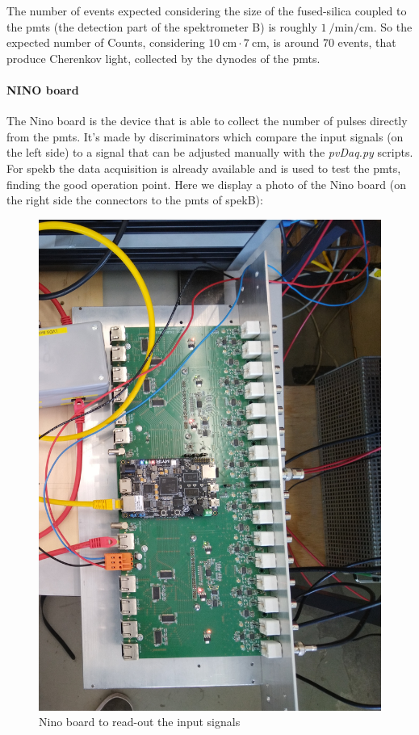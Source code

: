 \documentclass[10pt,a4paper]{article}
\begin{document}
The number of events expected considering the size of the fused-silica coupled to the pmts (the detection part of the spektrometer B) is roughly $\SI{1}{ \per \minute \per \cm}$. So the expected number of Counts, considering $\SI{10}{ \centi \meter } \cdot \SI{7}{ \centi \meter }$, is around 70 events, that produce Cherenkov light, collected by the dynodes of the pmts. 

\paragraph{NINO board}
The Nino board is the device that is able to collect the number of pulses directly from the pmts. It's made by discriminators which compare the input signals (on the left side) to a signal that can be adjusted manually with the \textit{pvDaq.py} scripts. For spekb the data acquisition is already available and is used to test the pmts, finding the good operation point. Here we display a photo of the Nino board (on the right side the connectors to the pmts of spekB):

\begin{figure}[hbtp]
\centering
\includegraphics[scale=0.08]{figures/IMG_20221102_193754.jpg}
\caption{Nino board to read-out the input signals}
\end{figure}
\end{document}
